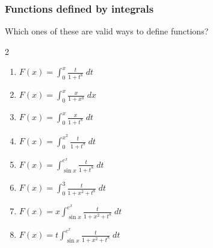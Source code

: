 \documentclass[14pt]{beamer}
\begin{document}
\begin{frame}[t]
	\fontsize{11}{11}\selectfont
	\frametitle{Functions defined by integrals}

	Which ones of these are valid ways to define functions?

	\vspace{.1cm}

	\begin{multicols}{2}
		\begin{enumerate}
			\item $\displaystyle F(x) = \int_{0}^{x}\frac{t}{1+ t^{8}}\; dt$
				\vspace{.3cm}

			\item $\displaystyle F(x) = \int_{0}^{x}\frac{x}{1+ x^{8}}\; dx$
				\vspace{.3cm}

			\item $\displaystyle F(x) = \int_{0}^{x}\frac{x}{1+ t^{8}}\; dt$
				\vspace{.3cm}

			\item $\displaystyle F(x) = \int_{0}^{x^2}\frac{t}{1+t^{8}}\; dt$
				\vspace{.3cm}

			\item $\displaystyle F(x) = \int_{\sin x}^{e^x}\frac{t}{1+t^{8}}\; dt$
				\vspace{.3cm}

			\item $\displaystyle F(x) = \int_{0}^{3}\frac{t}{1+x^{2}+t^{8}}\; dt$
				\vspace{.3cm}

			\item $\displaystyle F(x) = x \int_{\sin x}^{e^x}\frac{t}{1+x^{2}+t^{8}}\;
				dt$
				\vspace{.3cm}

			\item $\displaystyle F(x) = t \int_{\sin x}^{e^x}\frac{t}{1+x^{2}+t^{8}}\;
				dt$
				\vspace{.3cm}
		\end{enumerate}
	\end{multicols}
\end{frame}
\end{document}
